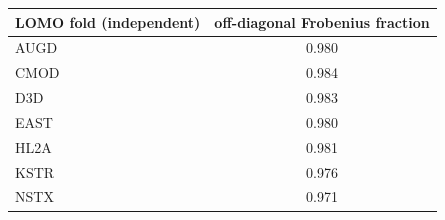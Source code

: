 \begin{tabular}{lc}
\toprule
LOMO fold (independent) & off-diagonal Frobenius fraction \\
\midrule
AUGD & 0.980 \\
CMOD & 0.984 \\
D3D & 0.983 \\
EAST & 0.980 \\
HL2A & 0.981 \\
KSTR & 0.976 \\
NSTX & 0.971 \\
\bottomrule
\end{tabular}
